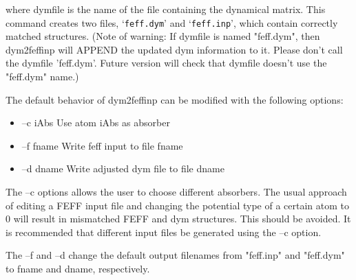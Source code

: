 \documentclass[11pt,oneside]{report} %
\newcommand{\file}[1]{`\texttt{#1}'}
\begin{document}
where dymfile is the name of the file containing the dynamical matrix. This
command creates two files, \file{feff.dym} and \file{feff.inp}, which contain correctly
matched structures. (Note of warning: If dymfile is named "feff.dym", then
dym2feffinp will APPEND the updated dym information to it. Please don't call the dymfile 'feff.dym'. Future version will check that dymfile
doesn't use the "feff.dym" name.)

The default behavior of dym2feffinp can be modified with the following options:
\begin{itemize}
\tightlist
 \item  --c  iAbs   Use atom iAbs as absorber
  \item --f  fname  Write feff input to file fname
 \item  --d  dname  Write adjusted dym file to file dname
\end{itemize}
The --c options allows the user to choose different absorbers. The usual
approach of editing a FEFF input file and changing the potential type of a
certain atom to 0 will result in mismatched FEFF and dym structures. This should
be avoided. It is recommended that different input files be generated using the
--c option.

The --f and --d change the default output filenames from "feff.inp" and
"feff.dym" to fname and dname, respectively.
\end{document}
